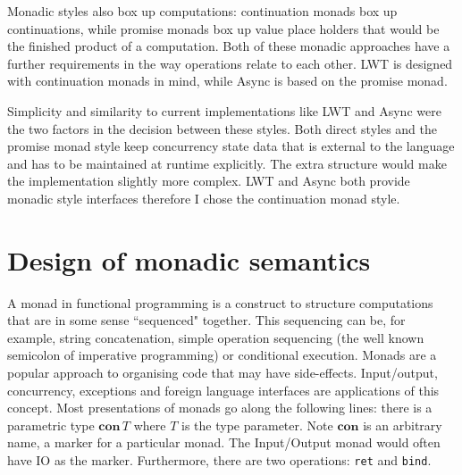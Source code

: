 \documentclass[12pt,twoside,notitlepage]{report}
\theoremstyle{plain}%
\theoremstyle{definition}
\theoremstyle{remark}
\begin{document}
Monadic styles also box up computations: continuation monads box up continuations\cite{Claessen99functionalpearls}, while promise monads\cite{liskov1988promises} box up value place holders that would be the finished product of a computation. Both of these monadic approaches have a further requirements in the way operations relate to each other. LWT is designed with continuation monads in mind, while Async is based on the promise monad.


Simplicity and similarity to current implementations like LWT and Async were the two factors in the decision between these styles. Both direct styles and the promise monad style keep concurrency state data that is external to the language and has to be maintained at runtime explicitly. The extra structure would make the implementation slightly more complex. LWT and Async both provide monadic style interfaces therefore I chose the continuation monad style.





\section{Design of monadic semantics}

%

\label{sec:monad_second_mention}
A monad\cite{hoareetal2001tackling} in functional programming is a construct to structure computations that are in some sense ``sequenced" together. This sequencing can be, for example, string concatenation, simple operation sequencing (the well known semicolon of imperative programming) or conditional execution. Monads are a popular approach to organising code that may have side-effects. Input/output, concurrency, exceptions and foreign language interfaces are applications of this concept. Most presentations of monads go along the following lines: there is a parametric type $ \textbf{con} \, T $ where $ T $ is the type parameter. Note $ \textbf{con} $ is an arbitrary name, a marker for a particular monad. The Input/Output monad would often have IO as the marker. Furthermore, there are two operations: \lstinline|ret| and \lstinline|bind|.
\end{document}
